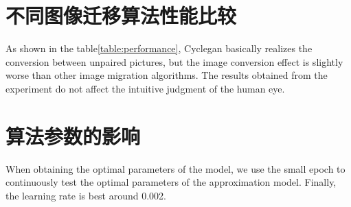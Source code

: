 


\section{\heiti 不同图像迁移算法性能比较}

As shown in the table\ref{table:performance}, 
Cyclegan basically realizes the conversion 
between unpaired pictures, 
but the image conversion effect is slightly 
worse than other image migration algorithms. 
The results obtained from the experiment do 
not affect the intuitive judgment of the human eye.

\begin{table}[htb]
  \center
  \caption{}
  \label{table:performance}
  \end{table}


\section{\heiti 算法参数的影响}
When obtaining the optimal parameters of the model,
 we use the small epoch to continuously test the optimal parameters of the approximation model. 
 Finally, the learning rate is best around 0.002.

